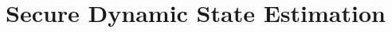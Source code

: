 \documentclass[10pt]{beamer}
\DeclareMathOperator{\1}{\textbf{1}}
\begin{document}

\section{Secure Dynamic State Estimation}
\end{document}
